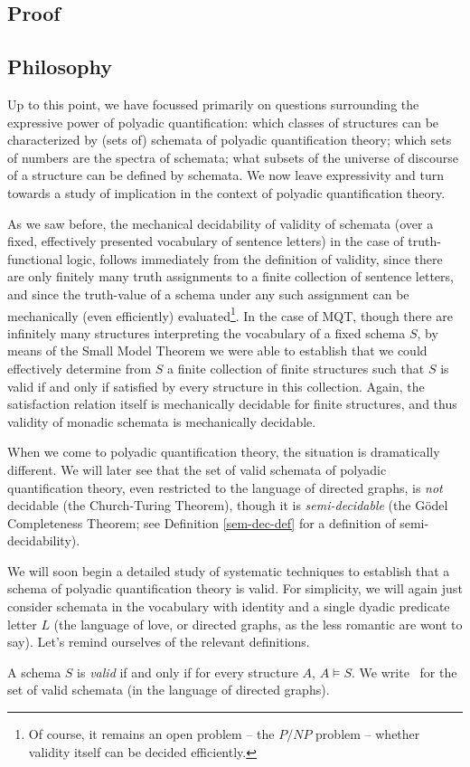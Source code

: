 \subsection{Proof}
\subsection*{Philosophy}
Up to this point, we have focussed primarily on questions surrounding the expressive power of polyadic quantification: which classes of structures can be characterized by (sets of) schemata of polyadic quantification theory; which sets of numbers are the spectra of schemata; what subsets of the universe of discourse of a structure can be defined by schemata. We now leave expressivity and turn towards a study of implication in the context of polyadic quantification theory. 

As we saw before, the mechanical decidability of validity of schemata (over a fixed, effectively presented vocabulary of sentence letters)
in the case of truth-functional logic, follows immediately from 
the definition of validity, since there are only finitely many truth assignments to a finite collection of sentence letters, and since the truth-value of a schema under any such assignment can be mechanically (even efficiently) evaluated\footnote{Of course, it remains an open problem  -- the $P/NP$ problem -- whether validity itself can be decided efficiently.}. In the case of MQT, though there are infinitely many structures interpreting the vocabulary of a fixed schema $S$, by means of the Small Model Theorem we were able to establish that we could effectively determine from $S$ a finite collection of finite structures such that $S$ is valid if and only if satisfied by every structure in this collection. Again, the satisfaction relation itself is mechanically decidable for finite structures, and thus validity of monadic schemata is mechanically decidable.

When we come to polyadic quantification theory, the situation is dramatically different. We will later see that the set of valid schemata of polyadic quantification theory, even restricted to the language of directed graphs, is \emph{not} decidable (the Church-Turing Theorem), though it is \emph{semi-decidable} (the G\"{o}del Completeness Theorem; see Definition \ref{sem-dec-def} for a definition of semi-decidability). 

We will soon begin a detailed study of systematic techniques to establish that a schema of polyadic quantification theory is valid. For simplicity, we will again just consider schemata in the vocabulary with identity and a single dyadic predicate letter $L$ (the language of love, or directed graphs, as the less romantic are wont to say). Let's remind ourselves of the relevant definitions.
\begin{definition}
A schema $S$ is \emph{valid} if and only if for every structure $A$, $A\models S$. We write \val\ for the set of valid schemata (in the language of directed graphs). 
\end{definition}

